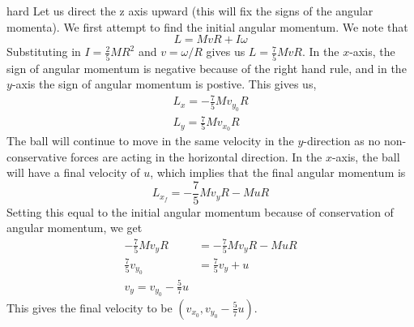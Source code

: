 \begin{solution}{hard}
Let us direct the z axis upward (this will fix the signs of the angular momenta). We first attempt to find the initial angular momentum. We note that 
\[L = MvR + I\omega\]
Substituting in $I = \frac{2}{5}MR^2$ and $v = \omega/R$ gives us $L = \frac{7}{5}MvR$. In the $x$-axis, the sign of angular momentum is negative because of the right hand rule, and in the $y$-axis the sign of angular momentum is postive. This gives us,
\begin{align*}
L_x = -\frac{7}{5}Mv_{y_0}R\\
L_y = \frac{7}{5}Mv_{x_0}R
\end{align*}
The ball will continue to move in the same velocity in the $y$-direction as no non-conservative forces are acting in the horizontal direction. In the $x$-axis, the ball will have a final velocity of $u$, which implies that the final angular momentum is 
\[L_{x_f} = -\frac{7}{5}Mv_y R - MuR\]
Setting this equal to the initial angular momentum because of conservation of angular momentum, we get 
\begin{align*}
-\frac{7}{5}Mv_{y} R&= -\frac{7}{5}Mv_y R - MuR\\
\frac{7}{5}v_{y_0}&= \frac{7}{5}v_y + u\\
v_y = v_{y_0} - \frac{5}{7}u
\end{align*}
This gives the final velocity to be $\boxed{(v_{x_0}, v_{y_0} - \frac{5}{7}u)}$.
\end{solution}

